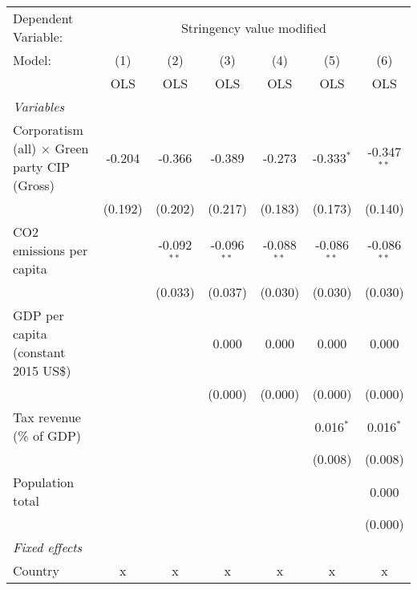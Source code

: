 
\begingroup
\centering
\begin{tabular}{lcccccc}
   \toprule
   Dependent Variable: & \multicolumn{6}{c}{Stringency value modified}\\
   Model:                                              & (1)     & (2)           & (3)           & (4)           & (5)           & (6)\\  
                                                       &  OLS    & OLS           & OLS           & OLS           & OLS           & OLS\\  
   \midrule
   \emph{Variables}\\
   Corporatism (all) $\times$ Green party CIP (Gross)  & -0.204  & -0.366        & -0.389        & -0.273        & -0.333$^{*}$  & -0.347$^{**}$\\   
                                                       & (0.192) & (0.202)       & (0.217)       & (0.183)       & (0.173)       & (0.140)\\   
   CO2 emissions per capita                            &         & -0.092$^{**}$ & -0.096$^{**}$ & -0.088$^{**}$ & -0.086$^{**}$ & -0.086$^{**}$\\   
                                                       &         & (0.033)       & (0.037)       & (0.030)       & (0.030)       & (0.030)\\   
   GDP per capita (constant 2015 US\$)                 &         &               & 0.000         & 0.000         & 0.000         & 0.000\\   
                                                       &         &               & (0.000)       & (0.000)       & (0.000)       & (0.000)\\   
   Tax revenue (\% of GDP)                             &         &               &               &               & 0.016$^{*}$   & 0.016$^{*}$\\   
                                                       &         &               &               &               & (0.008)       & (0.008)\\   
   Population total                                    &         &               &               &               &               & 0.000\\   
                                                       &         &               &               &               &               & (0.000)\\   
   \emph{Fixed effects}\\
   Country                                             & x       & x             & x             & x             & x             & x\\  

\end{tabular}
